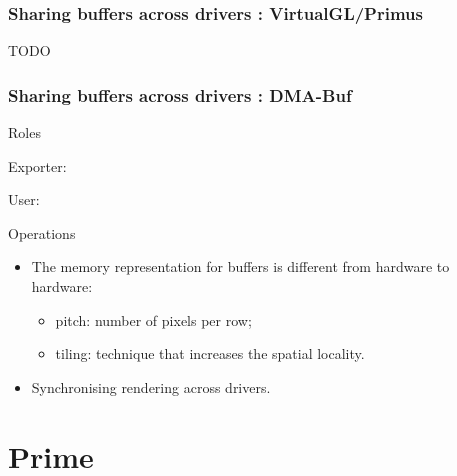 \documentclass[11pt,english,compress]{beamer}
\begin{document}

\begin{frame}
	\frametitle{Sharing buffers across drivers : VirtualGL/Primus}

	TODO
\end{frame}

\begin{frame}
	\frametitle{Sharing buffers across drivers : DMA-Buf}

	\begin{block}{Roles}
		\item Exporter: 
		\item User:
	\end{block}

	\begin{block}{Operations}
		\begin{itemize}
			\item The memory representation for buffers is different from hardware to hardware:
			\begin{itemize}
				\item pitch: number of pixels per row;
				\item tiling: technique that increases the spatial locality.
			\end{itemize}
			\item Synchronising rendering across drivers.
		\end{itemize}
	\end{block}
\end{frame}

\section{Prime}
\end{document}
